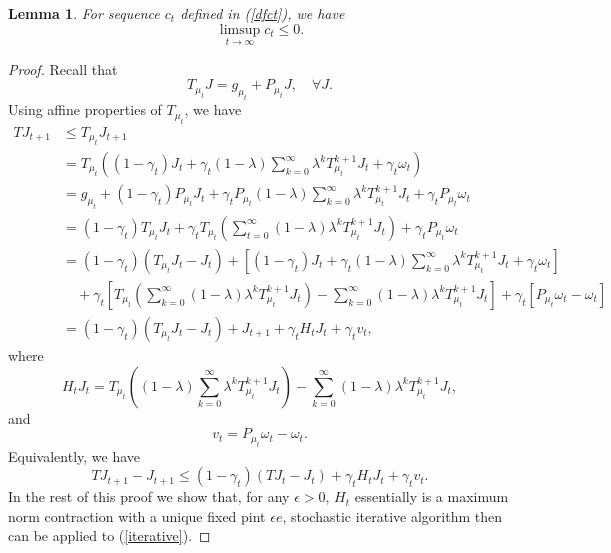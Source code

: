 \documentclass[12pt,a4paper]{amsart}
\numberwithin{equation}{section}
\theoremstyle{plain}
\newtheorem{Lemma}[Th]{Lemma}
\theoremstyle{definition}
\begin{document}
\begin{Lemma} \label{lmct2}
	For sequence $c_t$ defined in (\ref{dfct}), we have 
	$$
	\limsup_{t \to \infty} c_t \leq 0.
	$$
\end{Lemma}
\begin{proof}
	Recall that
	$$
	T_{\mu_t} J = g_{\mu_t} + P_{\mu_t} J, \quad \forall J.
	$$
	Using affine properties of $T_{\mu_t}$, we have
	\begin{equation*}
		\begin{aligned}
		TJ_{t+1} & \le T_{\mu_t} J_{t+1} \\
		& = T_{\mu_t} \left( (1-\gamma_t) J_t + \gamma_t (1-\lambda) \sum_{k=0}^{\infty} \lambda^k T_{\mu_t}^{k+1} J_t + \gamma_t \omega_t \right) \\
		& = g_{\mu_t} + (1-\gamma_t) P_{\mu_t} J_t + \gamma_t P_{\mu_t} (1-\lambda) \sum_{k=0}^{\infty} \lambda^k T_{\mu_t}^{k+1} J_t + \gamma_t P_{\mu_t} \omega_t \\
		& = (1-\gamma_t) T_{\mu_t}J_t + \gamma_t T_{\mu_t} \left(\sum_{t=0}^{\infty} (1-\lambda)\lambda^k T_{\mu_t}^{k+1} J_t \right) + \gamma_t P_{\mu_t} \omega_t \\
		& = (1-\gamma_t) \left(T_{\mu_t} J_t - J_t \right) + \left[ (1-\gamma_t) J_t + \gamma_t (1-\lambda) \sum_{k=0}^{\infty} \lambda^k T_{\mu_t}^{k+1} J_t + \gamma_t \omega_t  \right] \\
		& \quad+ \gamma_t\left[T_{\mu_t} \left(\sum_{k=0}^{\infty} (1-\lambda) \lambda^k T_{\mu_t}^{k+1} J_t\right) -  \sum_{k=0}^{\infty} (1-\lambda) \lambda^k T_{\mu_t}^{k+1} J_t \right] +\gamma_t  \left[ P_{\mu_t}\omega_t - \omega_t \right] \\
		& = (1-\gamma_t) \left(T_{\mu_t}J_t - J_t\right) + J_{t+1} + \gamma_t H_t J_t + \gamma_t v_t,
		\end{aligned} 
	\end{equation*}
	where
	$$
	H_t J_t = T_{\mu_t} \left((1-\lambda)\sum_{k=0}^{\infty} \lambda^k T_{\mu_t}^{k+1} J_t\right) -  \sum_{k=0}^{\infty} (1-\lambda)\lambda^k T_{\mu_t}^{k+1} J_t, 
	$$
	and 
	$$
	v_t = P_{\mu_t} \omega_t - \omega_t. 
	$$
	Equivalently, we have
	\begin{equation}\label{iterative}
	TJ_{t+1} - J_{t+1} \le (1-\gamma_t) \left(TJ_t - J_t\right) + \gamma_t H_t J_t + \gamma_t v_t. 
	\end{equation}
	In the rest of this proof we show that, for any $\epsilon > 0$,  $H_t$ essentially is a maximum norm contraction with a unique fixed pint $\epsilon e$, stochastic iterative algorithm then can be applied to (\ref{iterative}). 
	

\end{proof}
\end{document}
